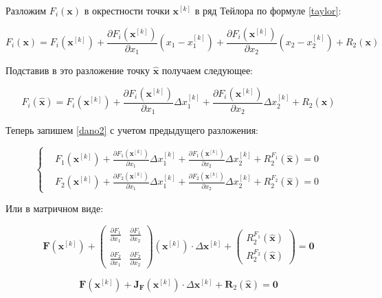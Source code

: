 \documentclass[12pt, a4paper]{article}
\newcommand{\roubr}[1]{\left(#1\right)}
\begin{document}
Разложим $F_i\roubr{\mathbf{x}}$ в окрестности точки $\mathbf{x}^{[k]}$ в ряд Тейлора по формуле \eqref{taylor}:

$$ F_i\roubr{\mathbf{x}} = F_i\roubr{\mathbf{x}^{[k]}} + \frac{\partial F_i\roubr{\mathbf{x}^{[k]}}}{\partial x_1} \roubr{x_1 - x^{[k]}_1} + \frac{\partial F_i\roubr{\mathbf{x}^{[k]}}}{\partial x_2} \roubr{x_2 - x^{[k]}_2} + R_2\roubr{\mathbf{x}} $$

Подставив в это разложение точку $\hat{\mathbf{x}}$ получаем следующее:

$$\displaystyle F_i\roubr{\hat{\mathbf{x}}} = F_i\roubr{\mathbf{x}^{[k]}} + \frac{\partial F_i\roubr{\mathbf{x}^{[k]}}}{\partial x_1} \Delta x^{[k]}_1 + \frac{\partial F_i\roubr{\mathbf{x}^{[k]}}}{\partial x_2} \Delta x^{[k]}_2 + R_2\roubr{\hat{\mathbf{x}}} $$

Теперь запишем \eqref{dano2} с учетом предыдущего разложения:

$$ \left\{
\begin{aligned}
& F_1\roubr{\mathbf{x}^{[k]}} + \frac{\partial F_1\roubr{\mathbf{x}^{[k]}}}{\partial x_1} \Delta x^{[k]}_1 + \frac{\partial F_1\roubr{\mathbf{x}^{[k]}}}{\partial x_2} \Delta x^{[k]}_2 + R^{F_1}_2\roubr{\hat{\mathbf{x}}} = 0 \\
& F_2\roubr{\mathbf{x}^{[k]}} + \frac{\partial F_2\roubr{\mathbf{x}^{[k]}}}{\partial x_1} \Delta x^{[k]}_1 + \frac{\partial F_2\roubr{\mathbf{x}^{[k]}}}{\partial x_2} \Delta x^{[k]}_2 + R^{F_2}_2\roubr{\hat{\mathbf{x}}} = 0
\end{aligned}
\right.$$

Или в матричном виде:

$$
\mathbf{F}\roubr{\mathbf{x}^{[k]}} + 
\begin{pmatrix}
\displaystyle \frac{\partial F_1}{\partial x_1} & \displaystyle \frac{\partial F_1}{\partial x_2} \\ \\
\displaystyle \frac{\partial F_2}{\partial x_1} & \displaystyle \frac{\partial F_2}{\partial x_2}
\end{pmatrix} \roubr{\mathbf{x}^{[k]}} \cdot \Delta \mathbf{x}^{[k]} + \begin{pmatrix}
\displaystyle R^{F_1}_2\roubr{\hat{\mathbf{x}}} \\
\displaystyle R^{F_2}_2\roubr{\hat{\mathbf{x}}}
\end{pmatrix} = \mathbf{0}
$$

$$
\mathbf{F}\roubr{\mathbf{x}^{[k]}} + \mathbf{J}_\mathbf{F}\roubr{\mathbf{x}^{[k]}} \cdot \Delta \mathbf{x}^{[k]} + \mathbf{R}_2\roubr{\hat{\mathbf{x}}} = \mathbf{0}
$$
\end{document}
